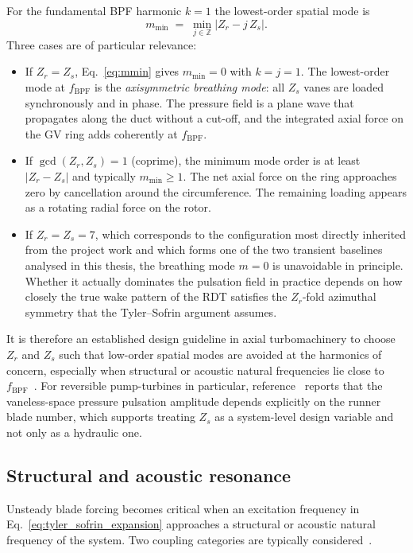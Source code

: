 For the fundamental BPF harmonic $k=1$ the lowest-order spatial mode is
\begin{equation}
    m_{\min} \;=\; \min_{j\in\mathbb{Z}} \bigl| Z_r - j\,Z_s \bigr|.
    \label{eq:mmin}
\end{equation}
Three cases are of particular relevance:
\begin{itemize}
  \item If $Z_r = Z_s$, Eq.~\eqref{eq:mmin} gives $m_{\min}=0$ with $k=j=1$. The lowest-order mode at $f_{\mathrm{BPF}}$ is the \emph{axisymmetric breathing mode}: all $Z_s$ vanes are loaded synchronously and in phase. The pressure field is a plane wave that propagates along the duct without a cut-off, and the integrated axial force on the GV ring adds coherently at $f_{\mathrm{BPF}}$.
  \item If $\gcd(Z_r,Z_s)=1$ (coprime), the minimum mode order is at least $|Z_r - Z_s|$ and typically $m_{\min} \geq 1$. The net axial force on the ring approaches zero by cancellation around the circumference. The remaining loading appears as a rotating radial force on the rotor.
  \item If $Z_r = Z_s = 7$, which corresponds to the configuration most directly inherited from the project work and which forms one of the two transient baselines analysed in this thesis, the breathing mode $m=0$ is unavoidable in principle. Whether it actually dominates the pulsation field in practice depends on how closely the true wake pattern of the RDT satisfies the $Z_r$-fold azimuthal symmetry that the Tyler--Sofrin argument assumes.
\end{itemize}
It is therefore an established design guideline in axial turbomachinery to choose $Z_r$ and $Z_s$ such that low-order spatial modes are avoided at the harmonics of concern, especially when structural or acoustic natural frequencies lie close to $f_{\mathrm{BPF}}$~\cite{Brekke2015,Egusquiza2006,Tanaka2011}. For reversible pump-turbines in particular, reference~\cite{Nduwayezu2021} reports that the vaneless-space pressure pulsation amplitude depends explicitly on the runner blade number, which supports treating $Z_s$ as a system-level design variable and not only as a hydraulic one.
 
\subsection{Structural and acoustic resonance}
\label{sec:rsi-resonance}
 
Unsteady blade forcing becomes critical when an excitation frequency in Eq.~\eqref{eq:tyler_sofrin_expansion} approaches a structural or acoustic natural frequency of the system. Two coupling categories are typically considered~\cite{Egusquiza2006,Tanaka2011}.
 
